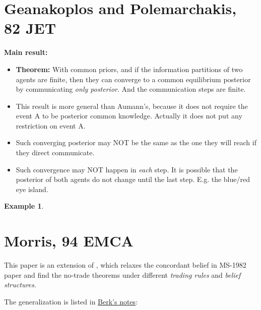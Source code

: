 \documentclass{book}
\theoremstyle{plain}
\theoremstyle{definition}
\newtheorem{exmp}{Example}[section] %
\begin{document}



\section{Geanakoplos and Polemarchakis, 82 JET} %
\label{sec:geanakoplos_and_polemarchakis}

\textbf{}

\vspace{1em}
\noindent
\textbf{Main result:}
\begin{itemize}
	\item \textbf{Theorem: }With common priors, and if the information partitions of two agents are finite, then they can converge to a common equilibrium posterior by communicating \textit{only posterior}. And the communication steps are finite.

	\item This result is more general than Aumann's, because it does not require the event A to be posterior common knowledge. Actually it does not put any restriction on event A.

	\item Such converging posterior may NOT be the same as the one they will reach if they direct communicate.

	\item Such convergence may NOT happen in \textit{each} step. It is possible that the posterior of both agents do not change until the last step. E.g. the blue/red eye island.
\end{itemize}

\begin{exmp}

\end{exmp}



\section{Morris, 94 EMCA} %
\label{sec:morris_94_emca}

\textbf{}

This paper is an extension of \cite{Milgrom:1982fv}, which relaxes the concordant belief in MS-1982 paper and find the no-trade theorems under different \textit{trading rules} and \textit{belief structures}.

The generalization is listed in \href{run:resources/Berk_bubbles_pres_feb20.pdf}{Berk's notes}:
\end{document}
